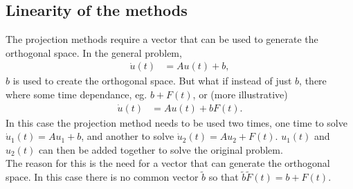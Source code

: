 \subsection{Linearity of the methods} %
The projection methods require a vector that can be used to generate the orthogonal space. In the general problem,
\begin{equation*}
\begin{aligned}
\dot{u}(t) &= Au(t) + b,
\end{aligned}
\end{equation*} 
$b$ is used to create the orthogonal space. But what if instead of just $b$, there where some time dependance, eg. $b + F(t)$, or (more illustrative)
\begin{equation*}
\begin{aligned}
\dot{u}(t) &= Au(t) + b F(t).
\end{aligned}
\end{equation*} 
In this case the projection method needs to be used two times, one time to solve $ \dot{u}_1(t) = Au_1 + b $, and another to solve $ \dot{u}_2(t) = Au_2 + F(t) $. $u_1(t)$ and $u_2(t)$ can then be added together to solve the original problem. \\
The reason for this is the need for a vector that can generate the orthogonal space. In this case there is no common vector $\tilde{b}$ so that $\tilde{b} \tilde{F}(t) = b + F(t)$. \\

